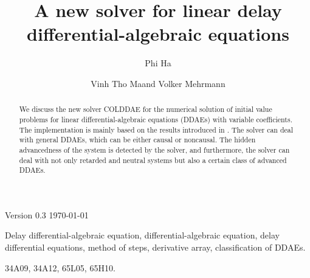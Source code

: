 \documentclass[final,reqno]{siamltex}
\begin{document}
\title{A new solver for linear delay differential-algebraic equations\footnotemark[1]}

\author{Phi Ha\footnotemark[2] \and Vinh Tho Ma\footnotemark[2] and Volker Mehrmann\footnotemark[2]}

\renewcommand{\thefootnote}{\fnsymbol{footnote}}


\maketitle

\newcommand{\thedate}{Version 0.3 \quad \today}

\begin{center}
\thedate
\end{center}

\vskip 0.2cm

\begin{abstract}
We discuss the new solver COLDDAE for the numerical solution of initial value problems for linear differential-algebraic equations (DDAEs) with variable coefficients. The implementation is mainly 
based on the results introduced in \cite{HaM14}. The solver can deal with general DDAEs, which can be either causal or noncausal. 
The hidden advancedness of the system is detected by the solver, and furthermore, the solver can deal with not only retarded and neutral systems but also a certain class of advanced DDAEs.
\end{abstract}

\begin{keywords} Delay differential-algebraic equation, differential-algebraic equation, delay differential equations, method of steps, derivative array, classification of DDAEs.
\end{keywords}

\begin{AMS}
34A09, 34A12, 65L05, 65H10.
\end{AMS}

\pagestyle{myheadings}
\thispagestyle{plain}
\end{document}
